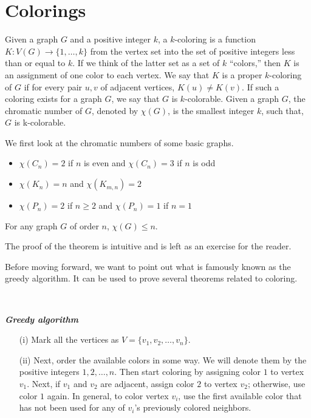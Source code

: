 \documentclass[../basic_graph_theory.tex]{subfiles}
\begin{document}
\chapter{Colorings}
\setcounter{chapter}{7} %
\setcounter{section}{0}
\setcounter{equation}{0}
\setcounter{figure}{0}

Given a graph $G$ and a positive integer $k$, a $k$-coloring is a function $K : V (G) \to \{1, \dots, k\}$ from the vertex set into the set of positive integers less than or equal to $k$. If we think of the latter set as a set of $k$ “colors,” then $K$ is an assignment of one color to each vertex. We say that $K$ is a proper $k$-coloring of $G$ if for every pair $u,v$ of adjacent vertices, $K(u) \neq K(v)$. If such a coloring exists for a graph $G$, we say that $G$ is $k$-colorable. Given a graph $G$, the chromatic number of $G$, denoted by $\chi(G)$, is the smallest integer $k$, such that, $G$ is k-colorable.

We first look at the chromatic numbers of some basic graphs.
\begin{itemize}
    \item $\chi(C_n) = 2$ if $n$ is even and $\chi(C_n)=3$ if $n$ is odd
    \item $\chi(K_n) = n$ and $\chi(K_{m,n}) = 2$
    \item $\chi(P_n) = 2$ if $n \ge 2$ and $\chi(P_n)=1$ if $n=1$
\end{itemize}

\begin{Thm}{}{}
    For any graph $G$ of order $n$, $\chi(G) \le n$.
\end{Thm}
The proof of the theorem is intuitive and is left as an exercise for the reader.

Before moving forward, we want to point out what is famously known as the greedy algorithm. It can be used to prove several theorems related to coloring.

\

\textbf{\textit{Greedy algorithm}}
\begin{enumerate}
    \item[(i)] Mark all the vertices as $V=\{v_1, v_2, \dots, v_n\}$.
    \item[(ii)] Next, order the available colors in some way. We will denote them by the positive integers $1,2,\dots,n$. Then start coloring by assigning color $1$ to vertex $v_1$. Next, if $v_1$ and $v_2$ are adjacent, assign color $2$ to vertex $v_2$; otherwise, use color $1$ again. In general, to color vertex $v_i$, use the first available color that has not been used for any of $v_i$'s previously colored neighbors.
\end{enumerate}
\end{document}
